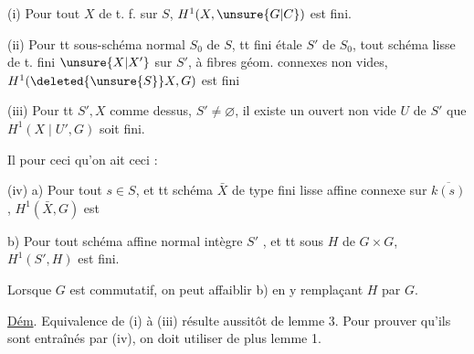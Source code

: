 
(i) Pour tout $X$ de t. f. sur $S$, $H^1(X,\unsure{G|C})$ est fini.

(ii) Pour tt sous-schéma  normal   $S_0$ de $S$,  tt  fini étale $S'$ de $S_0$, tout schéma  lisse de t. fini $\unsure{X|X'}$ sur $S'$, à fibres géom. connexes non vides, $H^1(\deleted{\unsure{S}}X,G)$ est fini

(iii) Pour tt $S',X$ comme dessus, $S'\ne\varnothing$, il existe un ouvert non vide $U$ de $S'$  que $H^1(X\mid U',G)$ soit fini.

Il  pour ceci qu'on ait ceci :

(iv) a) Pour tout $s\in S$, et tt schéma $\bar X$ de type fini lisse affine connexe sur $\overline{k(s)}$, $H^1(\bar X,G)$ est 

b) Pour tout   schéma affine normal intègre $S'$ ,  et tt sous  $H$ de $G\times G$,  $H^1(S',H)$ est fini.

Lorsque $G$ est commutatif, on peut affaiblir b) en y remplaçant $H$ par $G$.

\margin{\rule{4em}{.4pt}}
\uline{Dém}. Equivalence de (i) à (iii) résulte aussitôt de lemme 3. Pour prouver qu'ils sont entraînés par (iv), on doit utiliser de plus lemme 1.
